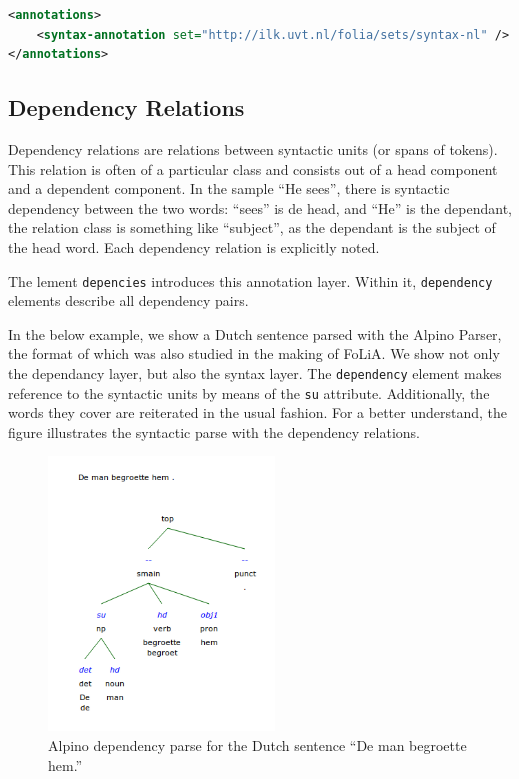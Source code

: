 \documentclass[a4paper,12pt]{report}
\begin{document}
\begin{lstlisting}[language=xml]
<annotations>
    <syntax-annotation set="http://ilk.uvt.nl/folia/sets/syntax-nl" />
</annotations>
\end{lstlisting}

\subsection{Dependency Relations}

Dependency relations are relations between syntactic units (or spans of tokens). This relation is often of a particular class and consists out of a head component and a dependent component. In the sample ``He sees'', there is  syntactic dependency between the two words: ``sees'' is de head, and ``He'' is the dependant, the relation class is something like ``subject'', as the dependant is the subject of the head word. Each dependency relation is explicitly noted.

The lement \texttt{depencies} introduces this annotation layer. Within it, \texttt{dependency} elements describe all dependency pairs. 

In the below example, we show a Dutch sentence parsed with the Alpino Parser, the format of which was also studied in the making of FoLiA. We show not only the dependancy layer, but also the syntax layer. The \texttt{dependency} element makes reference to the syntactic units by means of the \texttt{su} attribute. Additionally, the words they cover are reiterated in the usual fashion. For a better understand, the figure illustrates the syntactic parse with the dependency relations.

\begin{figure}[h]
\begin{center}
\includegraphics[width=60.0mm]{alpino.png}
\end{center}
\caption{Alpino dependency parse for the Dutch sentence ``De man begroette hem.''}
\label{fig:arch} 
\end{figure}
\FloatBarrier
\end{document}
